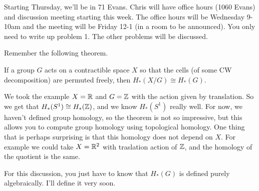
Starting Thursday, we'll be in 71 Evans. Chris will have office hours (1060 Evans) and discussion meeting starting this week. The office hours will be Wednesday 9-10am and the meeting will be Friday 12-1 (in a room to be announced). You only need to write up problem 1. The other problems will be discussed.

Remember the following theorem.
\begin{theorem}
 If a group $G$ acts on a contractible space $X$ so that the cells (of some CW decomposition) are permuted freely, then $H_*(X/G)\cong H_*(G)$.
\end{theorem}
We took the example $X=\mathbb{R}$ and $G=\mathbb{Z}$ with the action given by translation. So we get that $H_*(S^1)\cong H_*(\mathbb{Z})$, and we know $H_*(S^1)$ really well. For now, we haven't defined group homology, so the theorem is not so impressive, but this allows you to compute group homology using topological homology. One thing that is perhaps surprising is that this homology does not depend on $X$. For example we could take $X=\mathbb{R}^2$ with traslation action of $\mathbb{Z}$, and the homology of the quotient is the same.

For this discussion, you just have to know that $H_*(G)$ is defined purely algebraically. I'll define it very soon. 

